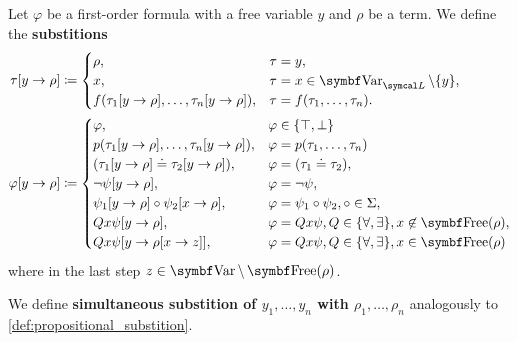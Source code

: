\begin{definition}\label{def:first_order_substition}
  Let \( \varphi \) be a first-order formula with a free variable \( y \) and \( \rho \) be a term. We define the \textbf{substitions}
  \begin{align*}
    \tau[y \to \rho] &\coloneqq \begin{cases}
      \rho,                                              &\tau = y, \\
      x,                                                 &\tau = x \in \Bold{Var}_{\Cal{L}} \setminus \{ y \}, \\
      f(\tau_1[y \to \rho], \ldots, \tau_n[y \to \rho]), &\tau = f(\tau_1, \ldots, \tau_n).
    \end{cases}
    \\
    \varphi[y \to \rho] &\coloneqq \begin{cases}
      \varphi,                                           &\varphi \in \{ \top, \bot \} \\
      p(\tau_1[y \to \rho], \ldots, \tau_n[y \to \rho]), &\varphi = p(\tau_1, \ldots, \tau_n) \\
      (\tau_1[y \to \rho] \doteq \tau_2[y \to \rho]),    &\varphi = (\tau_1 \doteq \tau_2), \\
      \neg \psi[y \to \rho],                             &\varphi = \neg \psi, \\
      \psi_1[y \to \rho] \circ \psi_2[x \to \rho],       &\varphi = \psi_1 \circ \psi_2, \circ \in \Sigma, \\
      Q x \psi[y \to \rho],                              &\varphi = Q x \psi, Q \in \{ \forall, \exists \}, x \not\in \Bold{Free}(\rho), \\
      Q x \psi[y \to \rho[x \to z]],                     &\varphi = Q x \psi, Q \in \{ \forall, \exists \}, x \in \Bold{Free}(\rho)
    \end{cases}
  \end{align*}
  where in the last step \( z \in \Bold{Var} \setminus \Bold{Free}(\rho) \).

  We define \textbf{simultaneous substition of \( y_1, \ldots, y_n \) with \( \rho_1, \ldots, \rho_n \)} analogously to \cref{def:propositional_substition}.
\end{definition}

